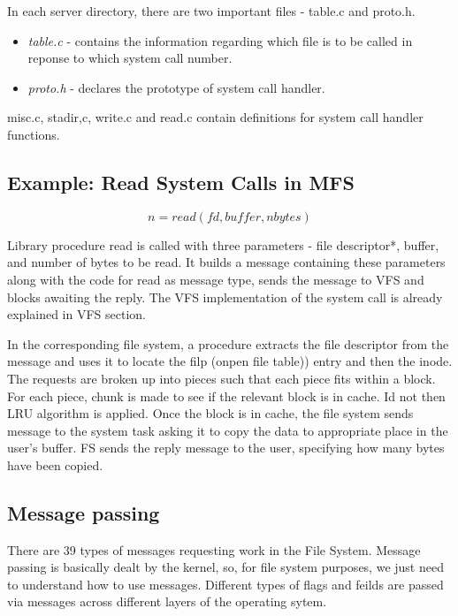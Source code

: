 In each server directory, there are two important files - table.c and proto.h.
\begin{itemize}
\item \emph{table.c} - contains the information regarding which file is to be called in reponse to which system call number.
\item \emph{proto.h} - declares the prototype of system call handler.
\end{itemize}
misc.c, stadir,c, write.c and read.c contain definitions for system call handler functions.

\subsection {Example: Read System Calls in MFS}
\begin{equation}
    n = read (fd, buffer, nbytes)
\end{equation}

Library procedure read is called with three parameters - file descriptor*, buffer, and number of bytes to be read. It builds a message containing these parameters along with the code for read as message type, sends the message to VFS and blocks awaiting the reply.
The VFS implementation of the system call is already explained in VFS section.

In the corresponding file system,  a procedure extracts the file descriptor from the message and uses it to locate the filp (onpen file table)) entry and then the inode. The requests are broken up into pieces such that each piece fits within a block. For each piece, chunk is made to see if the relevant block is in cache. Id not then LRU algorithm is applied.
Once the block is in cache, the file system sends message to the system task asking it to copy the data to appropriate place in the user's buffer. FS sends the reply message to the user, specifying how many bytes have been copied.

\subsection{Message passing}
There are 39 types of messages requesting work in the File System. Message
passing is basically dealt by the kernel, so, for file system purposes, we just
need to understand how to use messages. 
Different types of flags and feilds are passed via messages across different
layers of the operating sytem.





